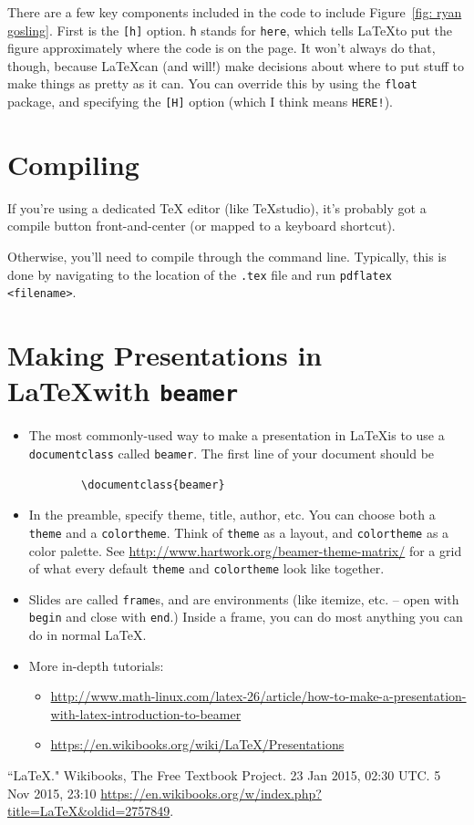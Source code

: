 \documentclass[12pt]{article}
\begin{document}
	There are a few key components included in the code to include Figure~\ref{fig: ryan gosling}. First is the \verb|[h]| option. \texttt{h} stands for \texttt{here}, which tells \LaTeX to put the figure approximately where the code is on the page. It won't always do that, though, because \LaTeX can (and will!) make decisions about where to put stuff to make things as pretty as it can. You can override this by using the \texttt{float} package, and specifying the \verb|[H]| option (which I think means \texttt{HERE!}).
	
	\section{Compiling}
	If you're using a dedicated TeX editor (like TeXstudio), it's probably got a compile button front-and-center (or mapped to a keyboard shortcut). 
	
	Otherwise, you'll need to compile through the command line. Typically, this is done by navigating to the location of the \texttt{.tex} file and run \texttt{pdflatex <filename>}.
	
	\section{Making Presentations in \LaTeX with \texttt{beamer}}
	\begin{itemize}
		\item The most commonly-used way to make a presentation in \LaTeX is to use a \texttt{documentclass} called \texttt{beamer}. The first line of your document should be
		\begin{verbatim}
		\documentclass{beamer}
		\end{verbatim}
		\item In the preamble, specify theme, title, author, etc. You can choose both a \texttt{theme} and a \texttt{colortheme}. Think of \texttt{theme} as a layout, and \texttt{colortheme} as a color palette. See \url{http://www.hartwork.org/beamer-theme-matrix/} for a grid of what every default \texttt{theme} and \texttt{colortheme} look like together.
		\item Slides are called \texttt{frame}s, and are environments (like itemize, etc. -- open with \texttt{begin} and close with \texttt{end}.) Inside a frame, you can do most anything you can do in normal \LaTeX.
		\item More in-depth tutorials:
		\begin{itemize}
			\item \url{http://www.math-linux.com/latex-26/article/how-to-make-a-presentation-with-latex-introduction-to-beamer}
			\item \url{https://en.wikibooks.org/wiki/LaTeX/Presentations}
		\end{itemize}
	\end{itemize}
	
	\begin{thebibliography}{99}
		 ``LaTeX." Wikibooks, The Free Textbook Project. 23 Jan 2015, 02:30 UTC. 5 Nov 2015, 23:10 \url{https://en.wikibooks.org/w/index.php?title=LaTeX&oldid=2757849}.
	\end{thebibliography}
	
\end{document}
